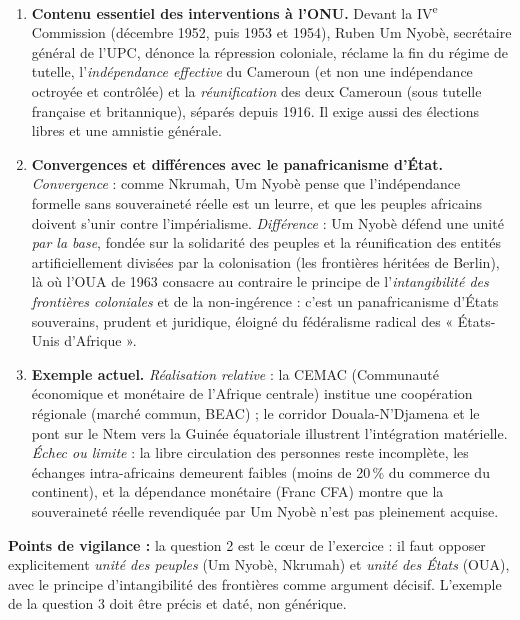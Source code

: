 \documentclass[11pt]{article}
\begin{document}
\begin{corrige}
\begin{enumerate}
\item \textbf{Contenu essentiel des interventions à l'ONU.} Devant la IV\textsuperscript{e} Commission (décembre 1952, puis 1953 et 1954), Ruben Um Nyobè, secrétaire général de l'UPC, dénonce la répression coloniale, réclame la fin du régime de tutelle, l'\emph{indépendance effective} du Cameroun (et non une indépendance octroyée et contrôlée) et la \emph{réunification} des deux Cameroun (sous tutelle française et britannique), séparés depuis 1916. Il exige aussi des élections libres et une amnistie générale.
\item \textbf{Convergences et différences avec le panafricanisme d'État.} \emph{Convergence} : comme Nkrumah, Um Nyobè pense que l'indépendance formelle sans souveraineté réelle est un leurre, et que les peuples africains doivent s'unir contre l'impérialisme. \emph{Différence} : Um Nyobè défend une unité \emph{par la base}, fondée sur la solidarité des peuples et la réunification des entités artificiellement divisées par la colonisation (les frontières héritées de Berlin), là où l'OUA de 1963 consacre au contraire le principe de l'\emph{intangibilité des frontières coloniales} et de la non-ingérence : c'est un panafricanisme d'États souverains, prudent et juridique, éloigné du fédéralisme radical des « États-Unis d'Afrique ».
\item \textbf{Exemple actuel.} \emph{Réalisation relative} : la CEMAC (Communauté économique et monétaire de l'Afrique centrale) institue une coopération régionale (marché commun, BEAC) ; le corridor Douala-N'Djamena et le pont sur le Ntem vers la Guinée équatoriale illustrent l'intégration matérielle. \emph{Échec ou limite} : la libre circulation des personnes reste incomplète, les échanges intra-africains demeurent faibles (moins de 20\,\% du commerce du continent), et la dépendance monétaire (Franc CFA) montre que la souveraineté réelle revendiquée par Um Nyobè n'est pas pleinement acquise.
\end{enumerate}

\textbf{Points de vigilance :} la question 2 est le cœur de l'exercice : il faut opposer explicitement \emph{unité des peuples} (Um Nyobè, Nkrumah) et \emph{unité des États} (OUA), avec le principe d'intangibilité des frontières comme argument décisif. L'exemple de la question 3 doit être précis et daté, non générique.
\end{corrige}
\end{document}
